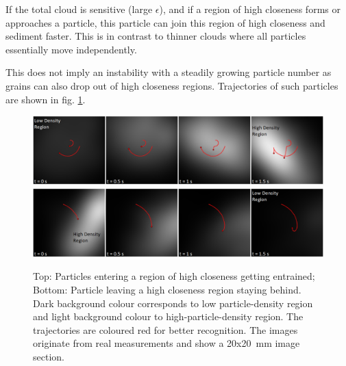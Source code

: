 If the total cloud is sensitive (large $\epsilon$), and if a region of high closeness forms or approaches a particle, this particle can join this region of high closeness and sediment faster. This is in contrast to thinner clouds where all particles essentially move independently. 

This does not imply an instability with a steadily growing particle number as grains can also drop out of high closeness regions. 
Trajectories of such particles are shown in fig. \ref{fig.entrain1}.

\begin{figure}[h]
\includegraphics[width=\columnwidth]{track1.pdf}
\includegraphics[width=\columnwidth]{track2.pdf}
    \caption{\label{fig.entrain1} Top: Particles entering a region of high closeness getting entrained; Bottom: Particle leaving a high closeness region staying behind. {Dark background colour corresponds to low particle-density region and light background colour to high-particle-density region. The trajectories are coloured red for better recognition. The images originate from real measurements and show a 20x20~mm image section.}}
\end{figure}

